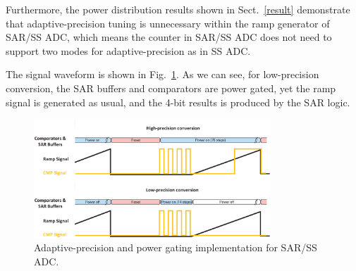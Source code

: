 Furthermore, the power distribution results shown in Sect.~\ref{result} demonstrate that adaptive-precision tuning is unnecessary within the ramp generator of SAR/SS ADC, which means the counter in SAR/SS ADC does not need to support two modes for adaptive-precision as in SS ADC.

The signal waveform is shown in Fig.~\ref{SAR_pg}. As we can see, for low-precision conversion, the SAR buffers and comparators are power gated, yet the ramp signal is generated as usual, and the 4-bit results is produced by the SAR logic. 

\begin{figure}[htbp]
	\centerline{\includegraphics[width=3.5in]{./Figures/SAR_pg.eps}}
	\caption{Adaptive-precision and power gating implementation for SAR/SS ADC.}
	\label{SAR_pg}
\end{figure} 
